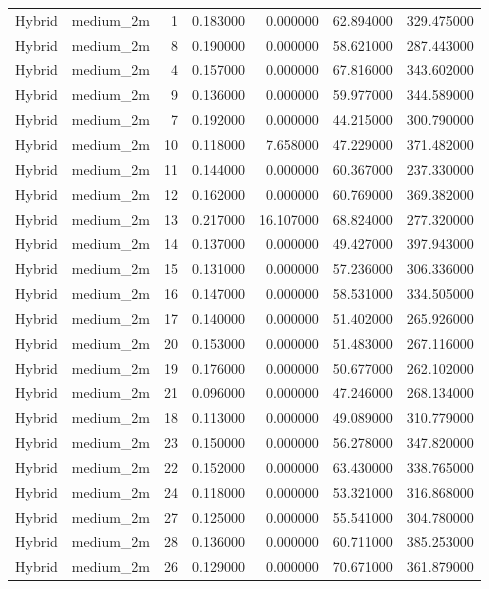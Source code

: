 \begin{tabular}{llrrrrr}
Hybrid & medium_2m & 1 & 0.183000 & 0.000000 & 62.894000 & 329.475000 \\
Hybrid & medium_2m & 8 & 0.190000 & 0.000000 & 58.621000 & 287.443000 \\
Hybrid & medium_2m & 4 & 0.157000 & 0.000000 & 67.816000 & 343.602000 \\
Hybrid & medium_2m & 9 & 0.136000 & 0.000000 & 59.977000 & 344.589000 \\
Hybrid & medium_2m & 7 & 0.192000 & 0.000000 & 44.215000 & 300.790000 \\
Hybrid & medium_2m & 10 & 0.118000 & 7.658000 & 47.229000 & 371.482000 \\
Hybrid & medium_2m & 11 & 0.144000 & 0.000000 & 60.367000 & 237.330000 \\
Hybrid & medium_2m & 12 & 0.162000 & 0.000000 & 60.769000 & 369.382000 \\
Hybrid & medium_2m & 13 & 0.217000 & 16.107000 & 68.824000 & 277.320000 \\
Hybrid & medium_2m & 14 & 0.137000 & 0.000000 & 49.427000 & 397.943000 \\
Hybrid & medium_2m & 15 & 0.131000 & 0.000000 & 57.236000 & 306.336000 \\
Hybrid & medium_2m & 16 & 0.147000 & 0.000000 & 58.531000 & 334.505000 \\
Hybrid & medium_2m & 17 & 0.140000 & 0.000000 & 51.402000 & 265.926000 \\
Hybrid & medium_2m & 20 & 0.153000 & 0.000000 & 51.483000 & 267.116000 \\
Hybrid & medium_2m & 19 & 0.176000 & 0.000000 & 50.677000 & 262.102000 \\
Hybrid & medium_2m & 21 & 0.096000 & 0.000000 & 47.246000 & 268.134000 \\
Hybrid & medium_2m & 18 & 0.113000 & 0.000000 & 49.089000 & 310.779000 \\
Hybrid & medium_2m & 23 & 0.150000 & 0.000000 & 56.278000 & 347.820000 \\
Hybrid & medium_2m & 22 & 0.152000 & 0.000000 & 63.430000 & 338.765000 \\
Hybrid & medium_2m & 24 & 0.118000 & 0.000000 & 53.321000 & 316.868000 \\
Hybrid & medium_2m & 27 & 0.125000 & 0.000000 & 55.541000 & 304.780000 \\
Hybrid & medium_2m & 28 & 0.136000 & 0.000000 & 60.711000 & 385.253000 \\
Hybrid & medium_2m & 26 & 0.129000 & 0.000000 & 70.671000 & 361.879000 \\

\end{tabular}
